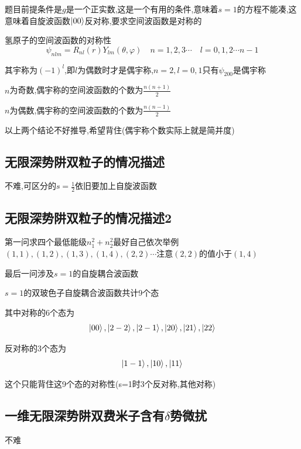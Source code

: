 \documentclass{article}
\begin{document}
            题目前提条件是$g$是一个正实数,这是一个有用的条件,意味着$s=1$的方程不能凑,这意味着自旋波函数$\ket{00}$反对称,要求空间波函数是对称的

            \begin{formal}
                氢原子的空间波函数的对称性
                $$
                \psi_{nlm} = R_{nl}(r)Y_{lm}(\theta,\varphi) \quad n=1,2,3\cdots \quad l = 0,1,2\cdots n-1
                $$

                其宇称为$(-1)^{l}$,即$l$为偶数时才是偶宇称,$n=2,l=0,1$只有$\psi_{200}$是偶宇称

                $n$为奇数,偶宇称的空间波函数的个数为$\frac{n(n+1)}{2}$

                $n$为偶数,偶宇称的空间波函数的个数为$\frac{n(n-1)}{2}$

                以上两个结论不好推导,希望背住(偶宇称个数实际上就是简并度)
            \end{formal}


        \subsection{无限深势阱双粒子的情况描述}
            不难,可区分的$s=\frac{1}{2}$依旧要加上自旋波函数

        \subsection{无限深势阱双粒子的情况描述2}
            第一问求四个最低能级$n_{1}^{2}+n_{2}^{2}$最好自己依次举例$(1,1),(1,2),(1,3),(1,4),(2,2)\cdots$注意$(2,2)$的值小于$(1,4)$

            最后一问涉及$s=1$的自旋耦合波函数

            \begin{formal}
                $s=1$的双玻色子自旋耦合波函数共计9个态

                其中对称的6个态为
                $$
                \ket{00},\ket{2-2},\ket{2-1},\ket{20},\ket{21},\ket{22}
                $$

                反对称的3个态为
                $$
                \ket{1-1},\ket{10},\ket{11}
                $$
            \end{formal}

            这个只能背住这9个态的对称性(s=1时3个反对称,其他对称)
        

        \subsection{一维无限深势阱双费米子含有\texorpdfstring{$\delta$}{}势微扰}
            不难
        
\end{document}
